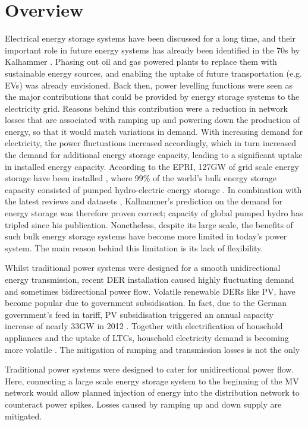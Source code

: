 \section{Overview}
\label{ch-review:sec:overview}

Electrical energy storage systems have been discussed for a long time, and their important role in future energy systems has already been identified in the 70s by Kalhammer \cite{Kalhammer1979}.
Phasing out oil and gas powered plants to replace them with sustainable energy sources, and enabling the uptake of future transportation (e.g. EVs) was already envisioned.
Back then, power levelling functions were seen as the major contributions that could be provided by energy storage systems to the electricity grid.
Reasons behind this contribution were a reduction in network losses that are associated with ramping up and powering down the production of energy, so that it would match variations in demand.
With increasing demand for electricity, the power fluctuations increased accordingly, which in turn increased the demand for additional energy storage capacity, leading to a significant uptake in installed energy capacity.
According to the EPRI, 127GW of grid scale energy storage have been installed \cite{Rehman2015}, where 99\% of the world's bulk energy storage capacity consisted of pumped hydro-electric energy storage \cite{TheEconomist2012a}.
In combination with the latest reviews and datasets \cite{Barbour2016, Barbour2015}, Kalhammer's prediction on the demand for energy storage was therefore proven correct; capacity of global pumped hydro has tripled since his publication.
Nonetheless, despite its large scale, the benefits of such bulk energy storage systems have become more limited in today's power system.
The main reason behind this limitation is its lack of flexibility.

Whilst traditional power systems were designed for a smooth unidirectional energy transmission, recent DER installation caused highly fluctuating demand and sometimes bidirectional power flow.
Volatile renewable DERs like PV, have become popular due to government subsidisation.
In fact, due to the German government's feed in tariff, PV subsidisation triggered an annual capacity increase of nearly 33GW in 2012 \cite{Hockenos2013}.
Together with electrification of household appliances and the uptake of LTCs, household electricity demand is becoming more volatile \cite{Jewell1987}.
The mitigation of ramping and transmission losses is not the only 

Traditional power systems were designed to cater for unidirectional power flow.
Here, connecting a large scale energy storage system to the beginning of the MV network would allow planned injection of energy into the distribution network to counteract power spikes.
Losses caused by ramping up and down supply are mitigated.

